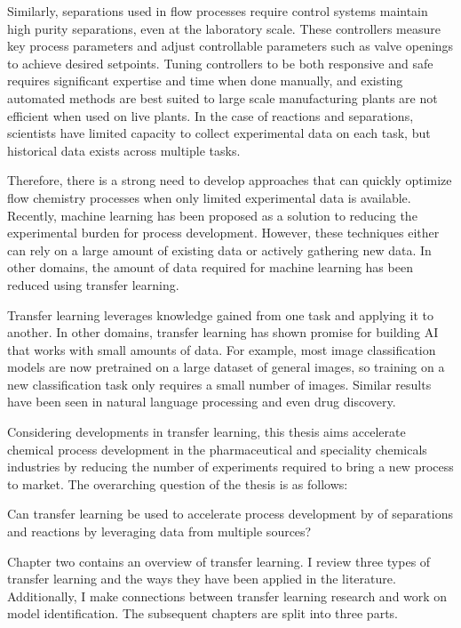 Similarly, separations used in flow processes require control systems maintain high purity separations, even at the laboratory scale. These controllers measure key process parameters and adjust controllable parameters such as valve openings to achieve desired setpoints. Tuning controllers to be both responsive and safe requires significant expertise and time when done manually, and existing automated methods are best suited to large scale manufacturing plants are not efficient when used on live plants. In the case of reactions and separations, scientists have limited capacity to collect experimental data on each task, but historical data exists across multiple tasks.

Therefore, there is a strong need to develop approaches that can quickly optimize flow chemistry processes when only limited experimental data is available. Recently, machine learning has been proposed as a solution to reducing the experimental burden for process development.  However, these techniques either can rely on a large amount of existing data or actively gathering new data.  In other domains, the amount of data required for machine learning has been reduced using transfer learning. 

Transfer learning leverages knowledge gained from one task and applying it to another. In other domains, transfer learning has shown promise for building AI that works with small amounts of data. For example, most image classification models are now pretrained on a large dataset of general images, so training on a new classification task only requires a small number of images. Similar results have been seen in natural language processing and even drug discovery. 

Considering developments in transfer learning, this thesis aims accelerate chemical process development in the pharmaceutical and speciality chemicals industries by reducing the number of experiments required to bring a new process to market. The overarching question of the thesis is as follows:

\begin{displayquote}
Can transfer learning be used to accelerate process development by of separations and reactions by leveraging data from multiple sources? 
\end{displayquote}


Chapter two contains an overview of transfer learning. I review  three types of transfer learning and the ways they have been applied in the literature. Additionally, I make connections between transfer learning research and work on model identification. The subsequent chapters are split into three parts.

